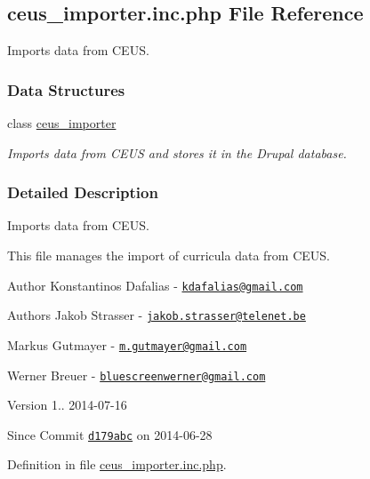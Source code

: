 \hypertarget{ceus__importer_8inc_8php}{\subsection{ceus\+\_\+importer.\+inc.\+php File Reference}
\label{ceus__importer_8inc_8php}
}


Imports data from C\+E\+U\+S.  


\subsubsection*{Data Structures}
\begin{DoxyCompactItemize}
\item 
class \hyperlink{classceus__importer}{ceus\+\_\+importer}
\begin{DoxyCompactList}\small\item\em Imports data from C\+E\+U\+S and stores it in the Drupal database. \end{DoxyCompactList}\end{DoxyCompactItemize}


\subsubsection{Detailed Description}
Imports data from C\+E\+U\+S. 

This file manages the import of curricula data from C\+E\+U\+S.

\begin{DoxyAuthor}{Author}
Konstantinos Dafalias -\/ \href{mailto:kdafalias@gmail.com}{\tt kdafalias@gmail.\+com} 
\end{DoxyAuthor}
\begin{DoxyAuthor}{Authors}
Jakob Strasser -\/ \href{mailto:jakob.strasser@telenet.be}{\tt jakob.\+strasser@telenet.\+be} 

Markus Gutmayer -\/ \href{mailto:m.gutmayer@gmail.com}{\tt m.\+gutmayer@gmail.\+com} 

Werner Breuer -\/ \href{mailto:bluescreenwerner@gmail.com}{\tt bluescreenwerner@gmail.\+com} 
\end{DoxyAuthor}
\begin{DoxyVersion}{Version}
1.. 2014-\/07-\/16 
\end{DoxyVersion}
\begin{DoxySince}{Since}
Commit \href{http://github.com/TheJake123/DrupalModul/commit/d179abcc5e05743086cd67cf1ce30b08923a7183}{\tt d179abc} on 2014-\/06-\/28 
\end{DoxySince}


Definition in file \hyperlink{ceus__importer_8inc_8php_source}{ceus\+\_\+importer.\+inc.\+php}.

